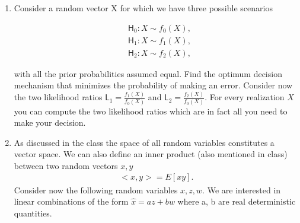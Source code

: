 \documentclass[letter, 12pt]{article}
\begin{document}
\begin{enumerate}[wide = 0pt, label = \textbf{Problem \arabic*:}]
		\item {Consider a random vector X for which we have three possible scenarios
		\begin{fleqn}[1cm]
			\begin{align*}
			&\mathsf{H}_0 : X \sim f_0 (X),\\
			&\mathsf{H}_1 : X \sim f_1 (X),\\
			&\mathsf{H}_2 : X \sim f_2 (X),
			\end{align*}
		\end{fleqn}
		with all the prior probabilities assumed equal. Find the optimum decision mechanism that minimizes the probability of making an error. Consider now the two likelihood ratios $ \mathsf{L}_1 = \frac{f_1(X)}{f_0(X)} $ and $ \mathsf{L}_2 = \frac{f_2(X)}{f_0(X)} $. For every realization $ X $ you can compute the two likelihood ratios which are in fact all you need to make your
		decision. }
	
		\item {As discussed in the class the space of all random variables constitutes a vector space. We can also define an inner product (also mentioned in class) between two random vectors $ x, y $ 
			\begin{align*}
				<x, y>= E[xy].
			\end{align*} Consider now the following random variables $ x, z, w $. We are interested in linear combinations of the form $ \hat{x}= az + bw $ where a, b are real deterministic quantities.}
	\end{enumerate}
\end{document}
